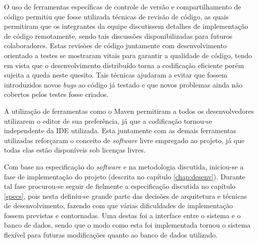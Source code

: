 O uso de ferramentas específicas de controle de versão e compartilhamento de código permitiu que fosse utilizada técnicas de revisão de código, as quais permitiram que os integrantes da equipe discutissem detalhes de implementação de código remotamente, sendo tais discussões disponibilizadas para futuros colaboradores. 
Estas revisões de código juntamente com desenvolvimento orientado a testes se mostraram vitais para garantir a qualidade de código, tendo em vista que o desenvolvimento distribuído torna a codificação eficiente porém sujeita a queda neste quesito.
Tais técnicas ajudaram a evitar que fossem introduzidos novos \emph{bugs} ao código já testado e que novos problemas ainda não cobertos pelos testes fosse criados.

A utilização de ferramentas como o Maven permitiram a todos os desenvolvedores utilizarem o editor de sua preferência, já que a codificação tornou-se independente da IDE utilizada.
Esta juntamente com as demais ferramentas utilizadas reforçaram o conceito de \emph{software} livre empregado ao projeto, já que todas elas estão disponíveis sob licenças livres. 

Com base na especificação do \emph{software} e na metodologia discutida, iniciou-se a fase de implementação do projeto (descrita no capítulo \ref{chap:desenv}). 
Durante tal fase procurou-se seguir de fielmente a especificação discutida no capítulo \ref{specs}, pois nesta definiu-se grande parte das decisões de arquitetura e técnicas de desenvolvimento, fazendo com que várias dificuldades de implementação fossem previstas e contornadas.
Uma destas foi a interface entre o sistema e o banco de dados, sendo que o modo como esta foi implementada tornou o sistema flexível para futuras modificações quanto ao banco de dados utilizado.

